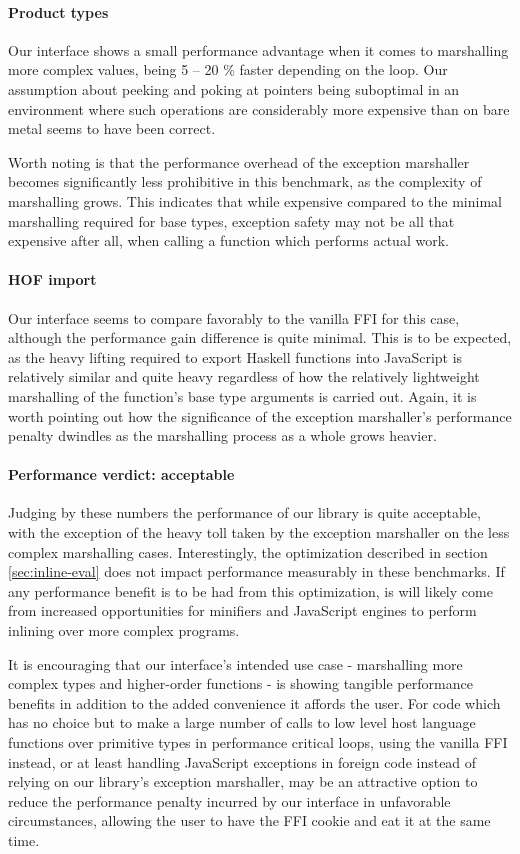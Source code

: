 \documentclass[preprint]{sigplanconf}
\begin{document}
\paragraph{Product types}
Our interface shows a small performance advantage when it comes to
marshalling more complex values, being 5 -- 20 \% faster
depending on the loop. Our assumption about peeking and poking at pointers
being suboptimal in an environment where such operations are considerably
more expensive than on bare metal seems to have been correct.

Worth noting is that the performance overhead of the exception marshaller
becomes significantly less prohibitive in this benchmark, as the complexity
of marshalling grows. This indicates that while expensive compared to
the minimal marshalling required for base types, exception safety may not be
all that expensive after all, when calling a function which performs actual
work.

\paragraph{HOF import}
Our interface seems to compare favorably to the vanilla FFI for this case,
although the performance gain difference is quite minimal. This is to be
expected, as the heavy lifting required to export Haskell functions into
JavaScript is relatively similar and quite heavy regardless of how the
relatively lightweight marshalling of the function's base type arguments
is carried out. Again, it is worth pointing out how the significance of the
exception marshaller's performance penalty dwindles as the marshalling
process as a whole grows heavier.

\paragraph{Performance verdict: acceptable}
Judging by these numbers the performance of our library is quite acceptable,
with the exception of the heavy toll taken by the exception marshaller on
the less complex marshalling cases.
Interestingly, the optimization described in section \ref{sec:inline-eval}
does not impact performance measurably in these benchmarks. If any
performance benefit is to be had from this optimization, is will likely come
from increased opportunities for minifiers and JavaScript engines to perform
inlining over more complex programs.

It is encouraging that our interface's intended use case - marshalling
more complex types and higher-order functions - is showing tangible performance
benefits in addition to the added convenience it affords the user.
For code which has no choice but to make a large number of calls to
low level host language functions over primitive types in performance critical
loops, using the vanilla FFI instead, or at least handling JavaScript
exceptions in foreign code instead of relying on our library's exception
marshaller, may be an attractive option to
reduce the performance penalty incurred by our interface in unfavorable circumstances,
allowing the user to have the FFI cookie and eat it at the same time.
\end{document}
